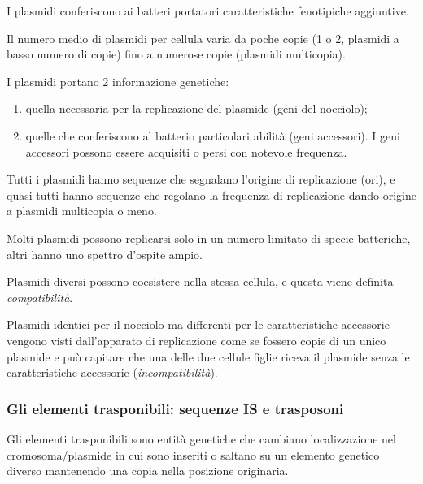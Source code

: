 \documentclass[11pt]{book}
\begin{document}
I plasmidi conferiscono ai batteri portatori caratteristiche fenotipiche aggiuntive.

Il numero medio di plasmidi per cellula varia da poche copie (1 o 2, plasmidi a basso numero di copie) fino a numerose copie (plasmidi multicopia).

I plasmidi portano 2 informazione genetiche:
\begin{enumerate}
\item quella necessaria per la replicazione del plasmide (geni del nocciolo);
\item quelle che conferiscono al batterio particolari abilità (geni accessori). I geni accessori possono essere acquisiti o persi con notevole frequenza.
\end{enumerate}

Tutti i plasmidi hanno sequenze che segnalano l’origine di replicazione (ori), e quasi tutti hanno sequenze che regolano la frequenza di replicazione dando origine a plasmidi multicopia o meno.

Molti plasmidi possono replicarsi solo in un numero limitato di specie batteriche, altri hanno uno spettro d’ospite ampio.

\vspace{1em}
Plasmidi diversi possono coesistere nella stessa cellula, e questa viene definita \emph{compatibilità}.
 
Plasmidi identici per il nocciolo ma differenti per le caratteristiche accessorie vengono visti dall’apparato di replicazione come se fossero copie di un unico plasmide e può capitare che una delle due cellule figlie riceva il plasmide senza le caratteristiche accessorie (\emph{incompatibilità}).


\clearpage
\subsubsection{Gli elementi trasponibili: sequenze IS e trasposoni}
Gli elementi trasponibili sono entità genetiche che cambiano localizzazione nel cromosoma/plasmide in cui sono inseriti o saltano su un elemento genetico diverso mantenendo una copia nella posizione originaria.
 
\end{document}
